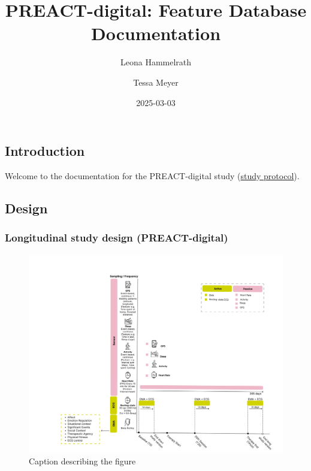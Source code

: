 \documentclass[
  letterpaper,
  DIV=11,
  numbers=noendperiod]{scrartcl}
\title{PREACT-digital: Feature Database Documentation}
\author{Leona Hammelrath \and Tessa Meyer}
\date{2025-03-03}
\begin{document}
\maketitle


\subsection{Introduction}\label{introduction}

Welcome to the documentation for the PREACT-digital study
(\href{https://doi.org/10.1101/2025.03.14.25323957}{study protocol}).

\subsection{Design}\label{design}

\subsubsection{Longitudinal study design
(PREACT-digital)}\label{longitudinal-study-design-preact-digital}

\begin{figure}[H]

{\centering \includegraphics[width=6.25in,height=\textheight,keepaspectratio]{images/preact-digital_study-procedure.png}

}

\caption{Caption describing the figure}

\end{figure}%
\end{document}
